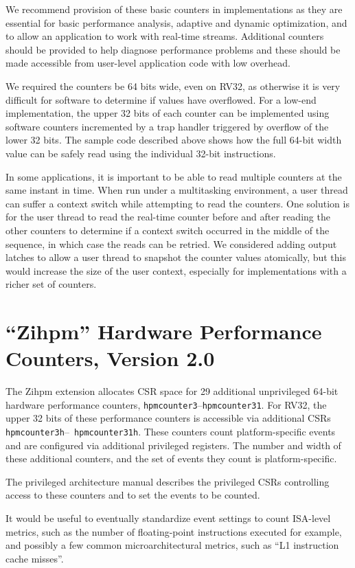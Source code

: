 \begin{commentary}
We recommend provision of these basic counters in implementations
as they are essential for basic performance analysis, adaptive and
dynamic optimization, and to allow an application to work with
real-time streams.  Additional counters should be provided to help
diagnose performance problems and these should be made accessible from
user-level application code with low overhead.

We required the counters be 64 bits wide, even on RV32, as otherwise
it is very difficult for software to determine if values have
overflowed.  For a low-end implementation, the upper 32 bits of each
counter can be implemented using software counters incremented by a
trap handler triggered by overflow of the lower 32 bits.  The sample
code described above shows how the full 64-bit width value can be
safely read using the individual 32-bit instructions.

In some applications, it is important to be able to read multiple
counters at the same instant in time.  When run under a multitasking
environment, a user thread can suffer a context switch while
attempting to read the counters.  One solution is for the user thread
to read the real-time counter before and after reading the other
counters to determine if a context switch occurred in the middle of the
sequence, in which case the reads can be retried.  We considered
adding output latches to allow a user thread to snapshot the counter
values atomically, but this would increase the size of the user
context, especially for implementations with a richer set of counters.
\end{commentary}

\section{``Zihpm'' Hardware Performance Counters, Version 2.0}

The Zihpm extension allocates CSR space for 29 additional unprivileged 64-bit
hardware performance counters, {\tt hpmcounter3}--{\tt hpmcounter31}.
For RV32, the upper 32 bits of these performance counters is
accessible via additional CSRs {\tt hpmcounter3h}--{\tt
  hpmcounter31h}.  These counters count platform-specific events and
are configured via additional privileged registers.  The number and
width of these additional counters, and the set of events they count
is platform-specific.

\begin{commentary}
  The privileged architecture manual describes the privileged CSRs
  controlling access to these counters and to set the events to be
  counted.

  It would be useful to eventually standardize event settings to count
  ISA-level metrics, such as the number of floating-point instructions
  executed for example, and possibly a few common microarchitectural
  metrics, such as ``L1 instruction cache misses''.
\end{commentary}
